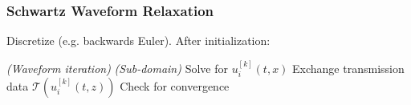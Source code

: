 \documentclass{beamer}
\begin{document}
\begin{frame}
  \frametitle{Schwartz Waveform Relaxation}
  Discretize (e.g. backwards Euler). After initialization: 

  \begin{algorithmic}
    \textit{ (Waveform iteration)}
       \textit{ (Sub-domain)}
          \State Solve for $u_i^{[k]}(t,x)$
        \EndFor
          \State Exchange transmission data $\mathcal{T}(u_i^{[k]}(t, z))$
        \EndFor
        \State Check for convergence
      \EndParFor
    \EndFor
  \end{algorithmic}

\end{frame}
\end{document}
